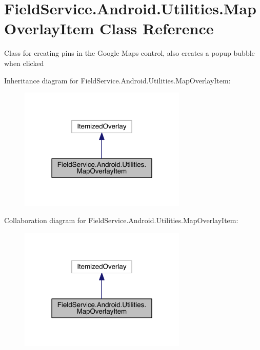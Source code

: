 \hypertarget{class_field_service_1_1_android_1_1_utilities_1_1_map_overlay_item}{\section{Field\+Service.\+Android.\+Utilities.\+Map\+Overlay\+Item Class Reference}
\label{class_field_service_1_1_android_1_1_utilities_1_1_map_overlay_item}
}


Class for creating pins in the Google Maps control, also creates a popup bubble when clicked  




Inheritance diagram for Field\+Service.\+Android.\+Utilities.\+Map\+Overlay\+Item\+:
\nopagebreak
\begin{figure}[H]
\begin{center}
\leavevmode
\includegraphics[width=226pt]{class_field_service_1_1_android_1_1_utilities_1_1_map_overlay_item__inherit__graph}
\end{center}
\end{figure}


Collaboration diagram for Field\+Service.\+Android.\+Utilities.\+Map\+Overlay\+Item\+:
\nopagebreak
\begin{figure}[H]
\begin{center}
\leavevmode
\includegraphics[width=226pt]{class_field_service_1_1_android_1_1_utilities_1_1_map_overlay_item__coll__graph}
\end{center}
\end{figure}

